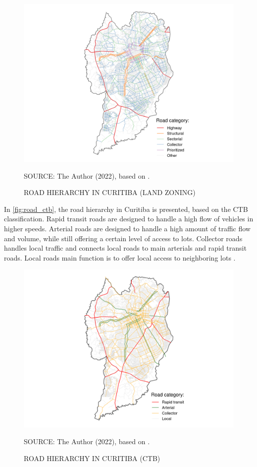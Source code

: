 \begin{figure}[!htbp]
    \centering\footnotesize
    \captionsetup{font=footnotesize}
    \caption{ROAD HIERARCHY IN CURITIBA (LAND ZONING)}
    \includegraphics{fig/road_zoning_map.png}
    \label{fig:road_cwb}
    \par SOURCE: The Author (2022), based on \textcite{IPPUC2021}.
\end{figure}

In \autoref{fig:road_ctb}, the road hierarchy in Curitiba is presented, based on the CTB classification. Rapid transit roads are designed to handle a high flow of vehicles in higher speeds. Arterial roads are designed to handle a high amount of traffic flow and volume, while still offering a certain level of access to lots. Collector roads handles local traffic and connects local roads to main arterials and rapid transit roads. Local roads main function is to offer local access to neighboring lots \cite{Brasil1997}. 

\begin{figure}[!htbp]
    \centering\footnotesize
    \captionsetup{font=footnotesize}
    \caption{ROAD HIERARCHY IN CURITIBA (CTB)}
    \includegraphics{fig/road_cwb_map.png}
    \label{fig:road_ctb}
    \par SOURCE: The Author (2022), based on \textcite{IPPUC2021}.
\end{figure}

